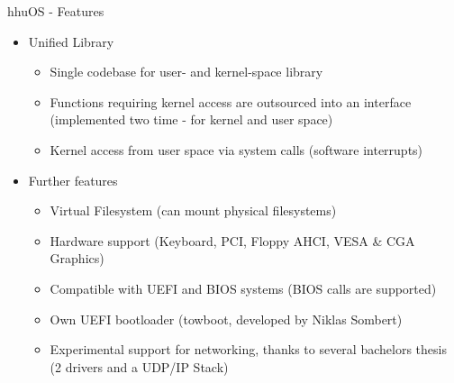 	\begin{frame}{hhuOS - Features}
		\begin{itemize}
			\item Unified Library
			\begin{itemize}
				\item Single codebase for user- and kernel-space library
				\item Functions requiring kernel access are outsourced into an interface (implemented two time - for kernel and user space)
				\item Kernel access from user space via system calls (software interrupts)
			\end{itemize}
			\pause
			\item Further features
			\begin{itemize}
				\item Virtual Filesystem (can mount physical filesystems)
				\item Hardware support (Keyboard, PCI, Floppy AHCI, VESA \& CGA Graphics)
				\item Compatible with UEFI and BIOS systems (BIOS calls are supported)
				\item Own UEFI bootloader (towboot, developed by Niklas Sombert)
				\item Experimental support for networking, thanks to several bachelors thesis (2 drivers and a UDP/IP Stack)
			\end{itemize}	
		\end{itemize}
	\end{frame}